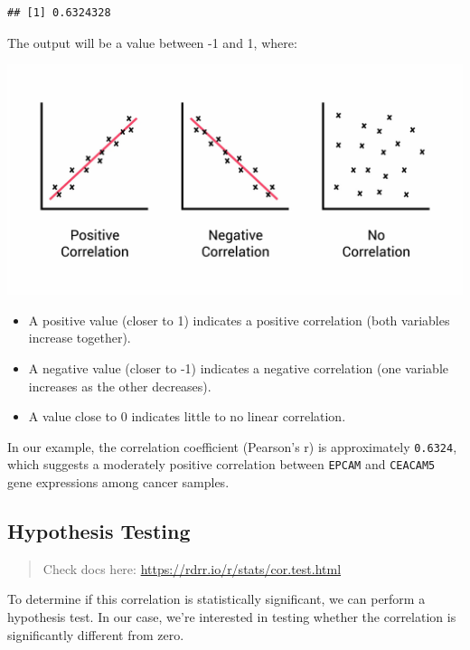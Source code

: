 \documentclass[
]{book}
\newenvironment{Shaded}{\begin{snugshade}}{\end{snugshade}}
\newcommand{\CommentTok}[1]{\textcolor[rgb]{0.56,0.35,0.01}{\textit{#1}}}
\newcommand{\FunctionTok}[1]{\textcolor[rgb]{0.13,0.29,0.53}{\textbf{#1}}}
\newcommand{\NormalTok}[1]{#1}
\newcommand{\OtherTok}[1]{\textcolor[rgb]{0.56,0.35,0.01}{#1}}
\newcommand{\SpecialCharTok}[1]{\textcolor[rgb]{0.81,0.36,0.00}{\textbf{#1}}}
\begin{document}
\begin{verbatim}
## [1] 0.6324328
\end{verbatim}

The output will be a value between -1 and 1, where:

\includegraphics{images/cor.png}

\begin{itemize}
\item
  A positive value (closer to 1) indicates a positive correlation (both variables increase together).
\item
  A negative value (closer to -1) indicates a negative correlation (one variable increases as the other decreases).
\item
  A value close to 0 indicates little to no linear correlation.
\end{itemize}

In our example, the correlation coefficient (Pearson's r) is approximately \texttt{0.6324}, which suggests a moderately positive correlation between \texttt{EPCAM} and \texttt{CEACAM5} gene expressions among cancer samples.

\hypertarget{hypothesis-testing}{%
\subsection{Hypothesis Testing}\label{hypothesis-testing}}

\begin{quote}
Check docs here: \url{https://rdrr.io/r/stats/cor.test.html}
\end{quote}

To determine if this correlation is statistically significant, we can perform a hypothesis test. In our case, we're interested in testing whether the correlation is significantly different from zero.

\begin{Shaded}
\end{Shaded}
\end{document}
